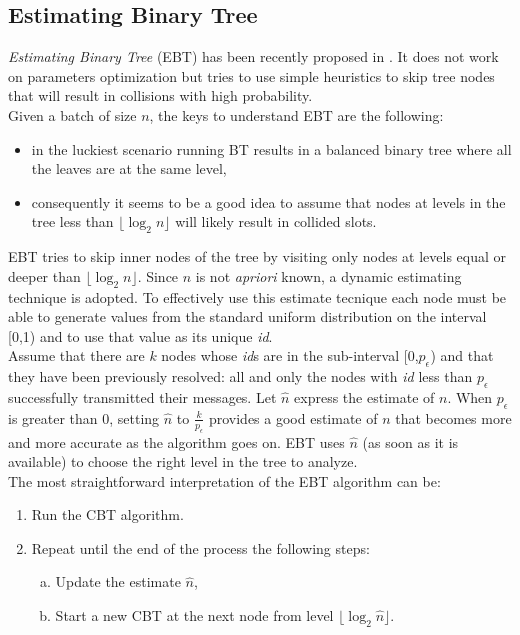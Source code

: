 \documentclass[12pt,a4paper]{report}
\newcommand{\pc}{p_{\epsilon}}
\begin{document}
\subsection{Estimating Binary Tree}
\label{se:EBT}
\emph{Estimating Binary Tree} (EBT) has been recently proposed in \cite{popovski}. It does not work on parameters optimization but tries to use simple heuristics to skip tree nodes that will result in collisions with high probability.\\
Given a batch of size $n$, the keys to understand EBT are the following:
\begin{itemize}
\item in the luckiest scenario running BT results in a balanced binary tree where all the leaves are at the same level,
\item consequently it seems to be a good idea to assume that nodes at levels in the tree less than $\lfloor \log_{2}n\rfloor$ will likely result in collided slots.
\end{itemize}

EBT tries to skip inner nodes of the tree by visiting only nodes at levels equal or deeper than $\lfloor \log_{2}n\rfloor$. Since $n$ is not \emph{apriori} known, a dynamic estimating technique is adopted. To effectively use this estimate tecnique each node must be able to generate values from the standard uniform distribution on the interval [0,1) and to use that value as its unique \emph{id}.\\
 Assume that there are $k$ nodes whose \emph{id}s are in the sub-interval [0,$\pc$) and that they have been previously resolved: all and only the nodes with \emph{id} less than $\pc$ successfully transmitted their messages.  Let $\hat{n}$ express the estimate of $n$. When $\pc$ is greater than 0, setting $\hat{n}$ to $\displaystyle\frac{k}{\pc}$ provides a good estimate of $n$ that becomes more and more accurate as the algorithm goes on. EBT uses $\hat{n}$ (as soon as it is available) to choose the right level in the tree to analyze.\\
 
 The most straightforward  interpretation of the EBT algorithm can be:
 \begin{enumerate}
\item Run the CBT algorithm.
\item Repeat until the end of the process the following steps:
\begin{enumerate}[a)]
\item Update the estimate $\hat{n}$,
\item Start a new CBT at the next node from level $\lfloor\log_{2}\hat{n}\rfloor$.

\end{enumerate}

\end{enumerate}
\end{document}
